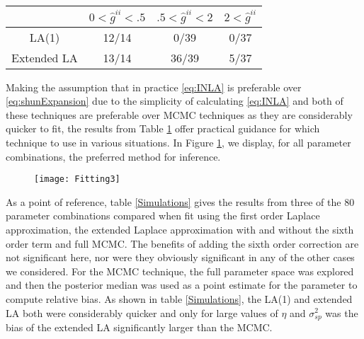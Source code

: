 \documentclass[11pt]{isuthesis}
\begin{document}
		
		\begin{table}[h]
			\begin{center}
				\begin{tabular}{ |c|c|c|c| } 
					\hline
					&$0<\hat{g}^{ii}<.5$&$ .5<\hat{g}^{ii}<2$ & $2<\hat{g}^{ii}$\\
					\hline
					LA(1)& 12/14 & 0/39 & 0/37\\
					Extended LA & 13/14 & 36/39 & 5/37\\
					\hline
				\end{tabular}
			\end{center}
			\label{Simulations2}
		\end{table}
	Making the assumption that in practice \eqref{eq:INLA} is preferable over \eqref{eq:shunExpansion} due to the simplicity of calculating \eqref{eq:INLA} and both of these techniques are preferable over MCMC techniques as they are considerably quicker to fit, the results from Table \ref{Simulations2} offer practical guidance for which technique to use in various situations.  In Figure \ref{fig:Fitting}, we display, for all parameter combinations, the preferred method for inference.
	
	
	\begin{figure}[!htp]
		\centering
		\texttt{[image: Fitting3]}
		\label{fig:Fitting}
	\end{figure}
	
	 As a point of reference, table \ref{Simulations} gives the results from three of the 80 parameter combinations compared when fit using the first order Laplace approximation, the extended Laplace approximation with and without the sixth order term and full MCMC. The benefits of adding the sixth order correction are not significant here, nor were they obviously significant in any of the other cases we considered.   For the MCMC technique, the full parameter space was explored and then the posterior median was used as a point estimate for the parameter to compute relative bias.  As shown in table \ref{Simulations}, the LA(1) and extended LA both were considerably quicker and only for large values of $\eta$ and $\sigma^2_{sp}$ was the bias of the extended LA significantly larger than the MCMC.
	 
\end{document}
